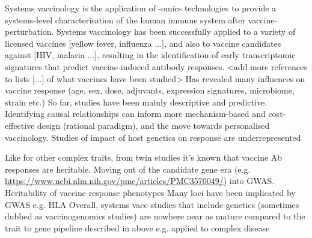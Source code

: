 \begin{outline}

\1 Systems vaccinology is the application of -omics technologies to provide a systems-level characterisation of the human immune system after vaccine-perturbation.
    \2 Systems vaccinology has been successfully applied to a variety of licensed vaccines [yellow fever, influenza ...], and also to vaccine candidates against [HIV, malaria ...], resulting in the identification of early transcriptomic signatures that predict vaccine-induced antibody responses.
        \3 <add more references to lists [...] of what vaccines have been studied>
    \2 Has revealed many influences on vaccine response (age, sex, dose, adjuvants, expression signatures, microbiome, strain etc.)
    \2 So far, studies have been mainly descriptive and predictive.
    \2 Identifying causal relationships can inform more mechanism-based and cost-effective design (rational paradigm), and the move towards personalised vaccinology.
    \2 Studies of impact of host genetics on response are underrepresented \autocite{linnik2016ImpactHostGenetic}

\1 Like for other complex traits, from twin studies it's known that vaccine Ab responses are heritable.
    \2 Moving out of the candidate gene era (e.g. \url{https://www.ncbi.nlm.nih.gov/pmc/articles/PMC3570049/}) into GWAS.
    \2 Heritability of vaccine response phenotypes \autocite{oconnor2013CharacterizingVaccineResponses}
    \2 Many loci have been implicated by GWAS e.g. HLA \autocite{oconnor2013CharacterizingVaccineResponses,mooney2013SystemsImmunogeneticsVaccines,mentzer2015SearchingHumanGenetic,linnik2016ImpactHostGenetic,scepanovic2018HumanGeneticVariants,dhakal2019HostFactorsImpact}
    \2 Overall, systems vacc studies that include genetics (sometimes dubbed as vaccinogenomics studies) are nowhere near as mature compared to the trait to gene pipeline described in above e.g. applied to complex disease


\end{outline}
